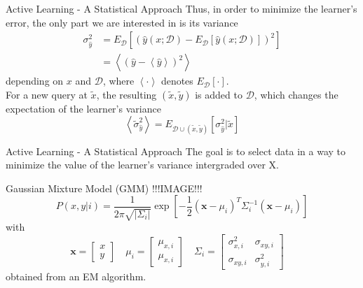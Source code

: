 \documentclass{beamer}
\newcommand{\D}{\mathcal{D}}
\newcommand{\ly}{\hat{y}(x;\D)}
\newcommand{\xt}{\tilde{x}}
\newcommand{\yt}{\tilde{y}}
\begin{document}
\begin{frame}{Active Learning - A Statistical Approach}
Thus, in order to minimize the learner's error, the only part we are interested
in is its variance
\begin{equation}\begin{split}
  \sigma_{\hat{y}}^2
  & = E_{\D} \left[\left(\ly - E_{\D} \left[\ly\right]\right)^2 \right] \\
  & = \left<(\hat{y} - \left<\hat{y}\right> )^2\right>
\end{split}\end{equation}
depending on $x$ and $\D$, where $\left< \cdot \right>$ denotes
$E_\D\left[\cdot\right]$.\\

For a new query at $\xt$, the resulting $(\xt,\yt)$ is added to $\D$, which
changes the expectation of the learner's variance
\begin{equation}
  \left< \tilde{\sigma}_{\hat{y}}^2 \right> =
  E_{\D\cup(\xt,\yt)} \left[\sigma_{\hat{y}}^2 | \xt \right]
\end{equation}
\end{frame}

\begin{frame}{Active Learning - A Statistical Approach}
The goal is to select data in a way to minimize the value of the
learner's variance intergraded over X.
\end{frame}


\begin{frame}{Gaussian Mixture Model (GMM)}
!!!IMAGE!!!
\begin{equation}
P(x,y|i) = \frac{1}{2\pi\sqrt{|\Sigma_i|}} \exp
\left[ -\frac{1}{2}(\mathbf{x}-\mu_i)^T\Sigma_i^{-1}(\mathbf{x}-\mu_i) \right]
\end{equation}
with
\[
\mathbf{x} = \left[ \begin{array}{c} x \\ y \end{array} \right] \quad
\mu_i = \left[ \begin{array}{c} \mu_{x,i} \\ \mu_{x,i} \end{array} \right] \quad
\Sigma_i = \left[ \begin{array}{cc} \sigma^2_{x,i} & \sigma_{xy,i} \\
    \sigma_{xy,i} & \sigma^2_{y,i} \end{array} \right] \quad
\]
obtained from an EM algorithm.
\end{frame}
\end{document}
